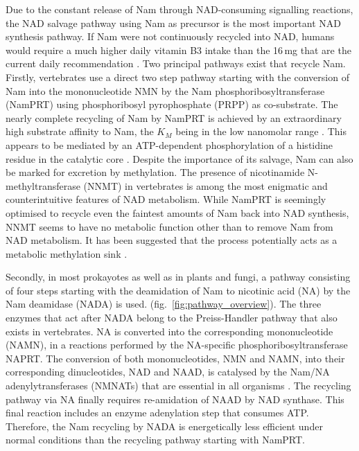 Due to the constant release of Nam through NAD-consuming signalling reactions, the NAD salvage pathway using Nam as precursor is the most important NAD synthesis pathway. If Nam were not continuously recycled into NAD, humans would require a much higher daily vitamin B3 intake than the 16\,mg that are the current daily recommendation \cite{CommissionofEuropeanCommunities2008}. Two principal pathways exist that recycle Nam. Firstly, vertebrates use a direct two step pathway starting with the conversion of Nam into the mononucleotide NMN by the Nam phosphoribosyltransferase (NamPRT) using phosphoribosyl pyrophosphate (PRPP) as co-substrate. The nearly complete recycling of Nam by NamPRT is achieved by an extraordinary high substrate affinity to Nam, the $K_{M}$ being in the low nanomolar range \cite{Burgos2008}. This appears to be mediated by an ATP-dependent phosphorylation of a histidine residue in the catalytic core \cite{Burgos2009}. Despite the importance of its salvage, Nam can also be marked for excretion by methylation. The presence of nicotinamide N-methyltransferase (NNMT) in vertebrates \cite{Gossmann2012FEBS} is among the most enigmatic and counterintuitive features of NAD metabolism. While NamPRT is seemingly optimised to recycle even the faintest amounts of Nam back into NAD synthesis, NNMT seems to have no metabolic function other than to remove Nam from NAD metabolism. It has been suggested that the process potentially acts as a metabolic methylation sink \cite{Pissios2017}.

Secondly, in most prokayotes as well as in plants and fungi, a pathway consisting of four steps starting with the deamidation of Nam to nicotinic acid (NA) by the Nam deamidase (NADA) is used. (fig.~\ref{fig:pathway_overview}). The three enzymes that act after NADA belong to the Preiss-Handler pathway that also exists in vertebrates. NA is converted into the corresponding mononucleotide (NAMN), in a reactions performed by the NA-specific phosphoribosyltransferase NAPRT. The conversion of both mononucleotides, NMN and NAMN, into their corresponding dinucleotides, NAD and NAAD, is catalysed by the Nam/NA adenylytransferases (NMNATs) that are essential in all organisms \cite{DeFigueiredo2011}. The recycling pathway via NA finally requires re-amidation of NAAD by NAD synthase. This final reaction includes an enzyme adenylation step that consumes ATP. Therefore, the Nam recycling by NADA is energetically less efficient under normal conditions than the recycling pathway starting with NamPRT. 

